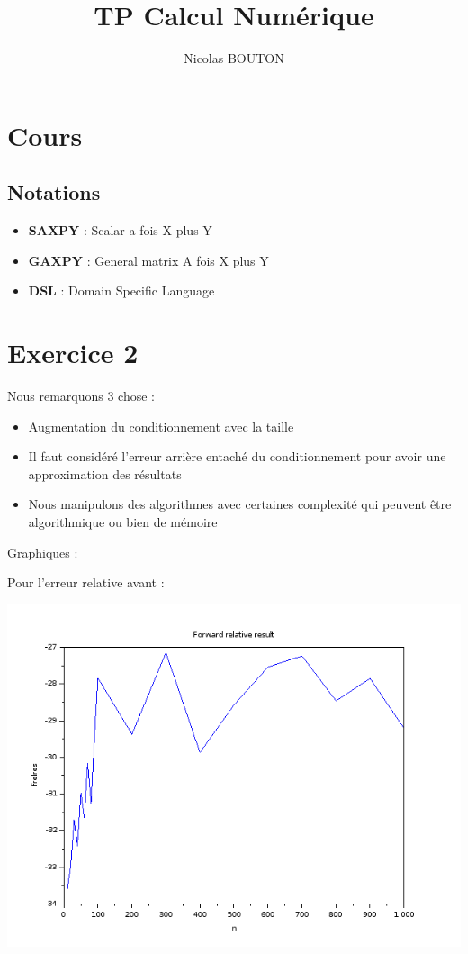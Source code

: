 \documentclass{article}
\title{TP Calcul Numérique}
\author{Nicolas BOUTON}
\begin{document}
\maketitle

\section*{Cours}

\subsection*{Notations}

\begin{itemize}
\item \textbf{SAXPY} : Scalar a fois X plus Y
\item \textbf{GAXPY} : General matrix A fois X plus Y
\item \textbf{DSL} : Domain Specific Language
\end{itemize}

\section*{Exercice 2}

Nous remarquons 3 chose :

\begin{itemize}
\item Augmentation du conditionnement avec la taille
\item Il faut considéré l'erreur arrière entaché du conditionnement
  pour avoir une approximation des résultats
\item Nous manipulons des algorithmes avec certaines complexité qui
  peuvent être algorithmique ou bien de mémoire
\end{itemize}

\underline{Graphiques :} \newline

Pour l'erreur relative avant :

\includegraphics[scale=0.5]{img/frelres.png}
\end{document}
